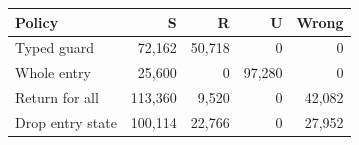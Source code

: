 \begin{tabular}{lrrrr}\toprule
Policy & S & R & U & Wrong\\\midrule
Typed guard & 72,162 & 50,718 & 0 & 0\\
Whole entry & 25,600 & 0 & 97,280 & 0\\
Return for all & 113,360 & 9,520 & 0 & 42,082\\
Drop entry state & 100,114 & 22,766 & 0 & 27,952\\
\bottomrule\end{tabular}

